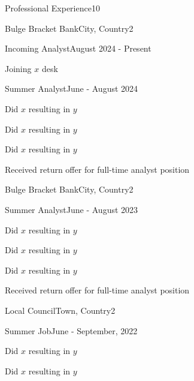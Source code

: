 \documentclass[10pt,a4paper]{CV}
\begin{document}
\begin{Section}{Professional Experience}{10}
    \begin{Institution}{Bulge Bracket Bank}{City, Country}{2}
        \begin{Position}{Incoming Analyst}{August 2024 - Present}
            \item Joining $x$ desk
            \vspace{-4pt}
        \end{Position}
        \begin{Position}{Summer Analyst}{June - August 2024}
            \item Did $x$ resulting in $y$
            \item Did $x$ resulting in $y$
            \item Did $x$ resulting in $y$
            \item Received return offer for full-time analyst position
        \end{Position}
    \end{Institution}
    
    \begin{Institution}{Bulge Bracket Bank}{City, Country}{2}
        \begin{Position}{Summer Analyst}{June - August 2023}
            \item Did $x$ resulting in $y$
            \item Did $x$ resulting in $y$
            \item Did $x$ resulting in $y$
            \item Received return offer for full-time analyst position
        \end{Position}
    \end{Institution}
    
    \begin{Institution}{Local Council}{Town, Country}{2}
        \begin{Position}{Summer Job}{June - September, 2022}
            \item Did $x$ resulting in $y$
            \item Did $x$ resulting in $y$
        \end{Position}
    \end{Institution}
\end{Section}
\end{document}
